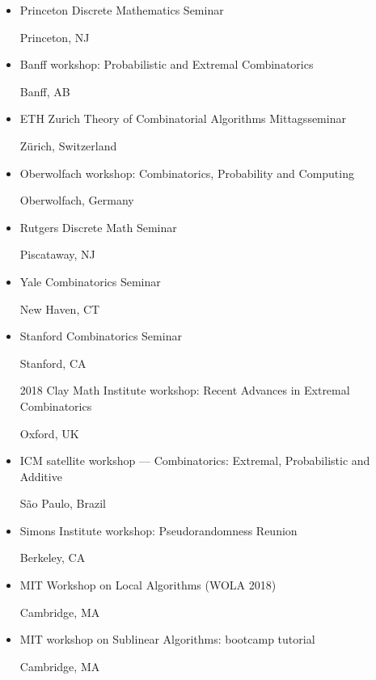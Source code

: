 \documentclass[11pt]{amsart}
\newcommand{\rightloc}[1]{\hfill {\raggedright #1}}
\begin{document}
\begin{itemize}[leftmargin=.4in,itemsep=5pt,topsep=0pt,label={}]
\item Princeton Discrete Mathematics Seminar \rightloc{Princeton, NJ}

\item Banff workshop: Probabilistic and Extremal Combinatorics \rightloc{Banff, AB}



\item ETH Zurich Theory of Combinatorial Algorithms Mittagsseminar \rightloc{Z\"urich, Switzerland}

\item Oberwolfach workshop: Combinatorics, Probability and Computing \rightloc{Oberwolfach, Germany}

\item Rutgers Discrete Math Seminar \rightloc{Piscataway, NJ}

\item Yale Combinatorics Seminar \rightloc{New Haven, CT}

\item Stanford Combinatorics Seminar \rightloc{Stanford, CA}

\item[2018] Clay Math Institute workshop: Recent Advances in Extremal Combinatorics \rightloc{Oxford, UK}

\item ICM satellite workshop --- Combinatorics: Extremal, Probabilistic and Additive \rightloc{S\~ao Paulo, Brazil}

\item Simons Institute workshop: Pseudorandomness Reunion \rightloc{Berkeley, CA}

\item MIT Workshop on Local Algorithms (WOLA 2018)  \rightloc{Cambridge, MA}

\item MIT workshop on Sublinear Algorithms: bootcamp tutorial \rightloc{Cambridge, MA}


\end{itemize}
\end{document}
